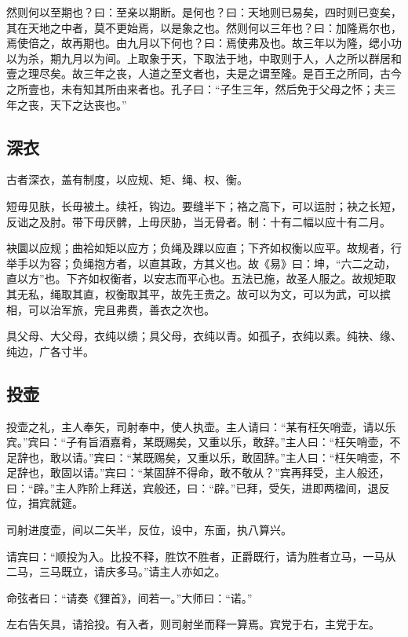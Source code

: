 \documentclass[]{article}
\begin{document}
然则何以至期也？曰：至亲以期断。是何也？曰：天地则已易矣，四时则已变矣，其在天地之中者，莫不更始焉，以是象之也。然则何以三年也？曰：加隆焉尔也，焉使倍之，故再期也。由九月以下何也？曰：焉使弗及也。故三年以为隆，缌小功以为杀，期九月以为间。上取象于天，下取法于地，中取则于人，人之所以群居和壹之理尽矣。故三年之丧，人道之至文者也，夫是之谓至隆。是百王之所同，古今之所壹也，未有知其所由来者也。孔子曰：``子生三年，然后免于父母之怀；夫三年之丧，天下之达丧也。''

\hypertarget{header-n823}{%
\subsection{深衣}\label{header-n823}}

古者深衣，盖有制度，以应规、矩、绳、权、衡。

短毋见肤，长毋被土。续衽，钩边。要缝半下；袼之高下，可以运肘；袂之长短，反诎之及肘。带下毋厌髀，上毋厌胁，当无骨者。制：十有二幅以应十有二月。

袂圜以应规；曲袷如矩以应方；负绳及踝以应直；下齐如权衡以应平。故规者，行举手以为容；负绳抱方者，以直其政，方其义也。故《易》曰：坤，``六二之动，直以方''也。下齐如权衡者，以安志而平心也。五法已施，故圣人服之。故规矩取其无私，绳取其直，权衡取其平，故先王贵之。故可以为文，可以为武，可以摈相，可以治军旅，完且弗费，善衣之次也。

具父母、大父母，衣纯以缋；具父母，衣纯以青。如孤子，衣纯以素。纯袂、缘、纯边，广各寸半。

\hypertarget{header-n830}{%
\subsection{投壶}\label{header-n830}}

投壶之礼，主人奉矢，司射奉中，使人执壶。主人请曰：``某有枉矢哨壶，请以乐宾。''宾曰：``子有旨酒嘉肴，某既赐矣，又重以乐，敢辞。''主人曰：``枉矢哨壶，不足辞也，敢以请。''宾曰：``某既赐矣，又重以乐，敢固辞。''主人曰：``枉矢哨壶，不足辞也，敢固以请。''宾曰：``某固辞不得命，敢不敬从？''宾再拜受，主人般还，曰：``辟。''主人阼阶上拜送，宾般还，曰：``辟。''已拜，受矢，进即两楹间，退反位，揖宾就筵。

司射进度壶，间以二矢半，反位，设中，东面，执八算兴。

请宾曰：``顺投为入。比投不释，胜饮不胜者，正爵既行，请为胜者立马，一马从二马，三马既立，请庆多马。''请主人亦如之。

命弦者曰：``请奏《狸首》，间若一。''大师曰：``诺。''

左右告矢具，请拾投。有入者，则司射坐而释一算焉。宾党于右，主党于左。
\end{document}
